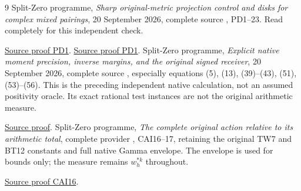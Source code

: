 \documentclass[11pt]{article}
\begin{document}
\begin{thebibliography}{9}
 Split-Zero programme,
\emph{Sharp original-metric projection control and disks for complex
mixed pairings}, 20 September 2026, complete source
,
PD1--23. Read completely for this independent check.

\href{https://github.com/KokunoYumeto/zeta-function-research-reader/blob/5992ad50c0f2a06921f1fcaded7b4e38097c0739/workbenches/splitzero-tandem/continuations/20260920-original-kernel-mixed-determinants/providers/PROJECTION_PHASE_DERIVATION.tex\#L22}{Source proof PD1}. \href{https://github.com/KokunoYumeto/zeta-function-research-reader/blob/5992ad50c0f2a06921f1fcaded7b4e38097c0739/workbenches/splitzero-tandem/continuations/20260920-original-kernel-mixed-determinants/providers/PROJECTION_PHASE_RETURN.tex\#L25}{Source proof PD1}.
 Split-Zero programme,
\emph{Explicit native moment precision, inverse margins, and the
original signed receiver}, 20 September 2026, complete source
,
especially equations (5), (13), (39)--(43), (51), (53)--(56).
This is the preceding independent native calculation, not an
assumed positivity oracle. Its exact rational test instances are
not the original arithmetic measure.

\href{https://github.com/KokunoYumeto/zeta-function-research-reader/blob/5992ad50c0f2a06921f1fcaded7b4e38097c0739/workbenches/splitzero-tandem/continuations/20260920-original-kernel-mixed-determinants/providers/NATIVE_MOMENT_PRECISION.tex\#L1}{Source proof}.
 Split-Zero programme,
\emph{The complete original action relative to its arithmetic total},
complete provider , CAI16--17,
retaining the original TW7 and BT12 constants and full native
Gamma envelope. The envelope is used for bounds only; the
measure remains $w_h^{*k}$ throughout.

\href{https://github.com/KokunoYumeto/zeta-function-research-reader/blob/487253b5b01851da5b9b98af4e146fecf1fab902/workbenches/splitzero-tandem/continuations/20260919-full-window-source-products/providers/CAI_COMPLETE_PREREQUISITE.tex\#L284}{Source proof CAI16}.
\end{thebibliography}
\end{document}
